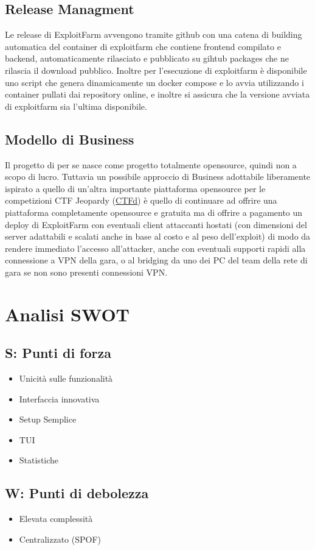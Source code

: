 \documentclass[11pt]{article}
\begin{document}
\subsection{Release Managment}
Le release di ExploitFarm avvengono tramite github con una catena di building automatica del container di exploitfarm che contiene frontend compilato e backend, automaticamente rilasciato e pubblicato su gihtub packages che ne rilascia il download pubblico.
Inoltre per l'esecuzione di exploitfarm è disponibile uno script che genera dinamicamente un docker compose e lo avvia utilizzando i container pullati dai repository online, e inoltre si assicura che la versione avviata di exploitfarm sia l'ultima disponibile.
\subsection{Modello di Business}
Il progetto di per se nasce come progetto totalmente opensource, quindi non a scopo di lucro. Tuttavia un possibile approccio di Business adottabile liberamente ispirato a quello di un'altra importante piattaforma opensource per le competizioni CTF Jeopardy (\href{https://github.com/CTFd/CTFd}{CTFd}) è quello di continuare ad offrire una piattaforma completamente opensource e gratuita ma di offrire a pagamento un deploy di ExploitFarm con eventuali client attaccanti hostati (con dimensioni del server adattabili e scalati anche in base al costo e al peso dell'exploit) di modo da rendere immediato l'accesso all'attacker, anche con eventuali supporti rapidi alla connessione a VPN della gara, o al bridging da uno dei PC del team della rete di gara se non sono presenti connessioni VPN.
\section{Analisi SWOT}
\subsection{S: Punti di forza}
\begin{itemize}
	\item Unicità sulle funzionalità
	\item Interfaccia innovativa
	\item Setup Semplice
	\item TUI
	\item Statistiche
\end{itemize}
\subsection{W: Punti di debolezza}
\begin{itemize}
	\item Elevata complessità
	\item Centralizzato (SPOF)
\end{itemize}
\end{document}
